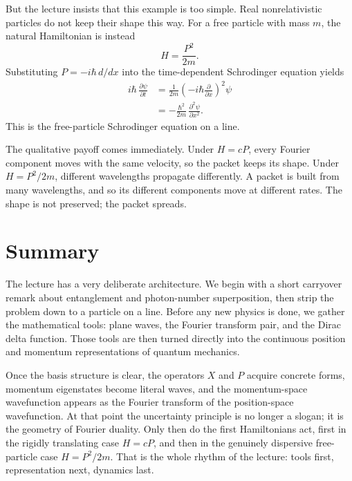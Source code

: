 But the lecture insists that this example is too simple. Real nonrelativistic particles do not keep their shape this way. For a free particle with mass $m$, the natural Hamiltonian is instead
\begin{equation}
H=\frac{P^2}{2m}.
\end{equation}
Substituting $P=-i\hbar\,d/dx$ into the time-dependent Schrodinger equation yields
\begin{align}
i\hbar\,\frac{\partial \psi}{\partial t}
&=\frac{1}{2m}\left(-i\hbar\frac{\partial}{\partial x}\right)^2\psi \\
&=-\frac{\hbar^2}{2m}\,\frac{\partial^2\psi}{\partial x^2}.
\end{align}
This is the free-particle Schrodinger equation on a line.

The qualitative payoff comes immediately. Under $H=cP$, every Fourier component moves with the same velocity, so the packet keeps its shape. Under $H=P^2/2m$, different wavelengths propagate differently. A packet is built from many wavelengths, and so its different components move at different rates. The shape is not preserved; the packet spreads.

\section{Summary}

The lecture has a very deliberate architecture. We begin with a short carryover remark about entanglement and photon-number superposition, then strip the problem down to a particle on a line. Before any new physics is done, we gather the mathematical tools: plane waves, the Fourier transform pair, and the Dirac delta function. Those tools are then turned directly into the continuous position and momentum representations of quantum mechanics.

Once the basis structure is clear, the operators $X$ and $P$ acquire concrete forms, momentum eigenstates become literal waves, and the momentum-space wavefunction appears as the Fourier transform of the position-space wavefunction. At that point the uncertainty principle is no longer a slogan; it is the geometry of Fourier duality. Only then do the first Hamiltonians act, first in the rigidly translating case $H=cP$, and then in the genuinely dispersive free-particle case $H=P^2/2m$. That is the whole rhythm of the lecture: tools first, representation next, dynamics last.